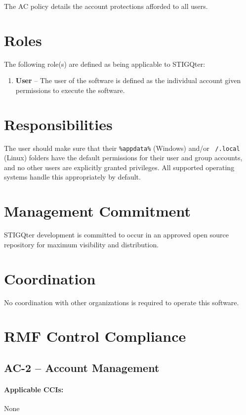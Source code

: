 \documentclass[letterpaper, 10pt, twoside]{article}
\begin{document}
The AC policy details the account protections afforded to all users.

\section{Roles}
\label{sec:roles}

The following role(s) are defined as being applicable to STIGQter:
\begin{enumerate}
	\item \textbf{User} -- The user of the software is defined as the individual account given permissions to execute the software.
\end{enumerate}

\section{Responsibilities}
\label{sec:responsibilities}

The user should make sure that their \texttt{\%appdata\%} (Windows) and/or \texttt{~/.local} (Linux) folders have the default permissions for their user and group accounts, and no other users are explicitly granted privileges. All supported operating systems handle this appropriately by default.

\section{Management Commitment}

STIGQter development is committed to occur in an approved open source repository for maximum visibility and distribution.

\section{Coordination}

No coordination with other organizations is required to operate this software.

\section{RMF Control Compliance}

\subsection{AC-2 -- Account Management}
\label{sec:ac-2}

\paragraph{Applicable CCIs:} None
\end{document}
